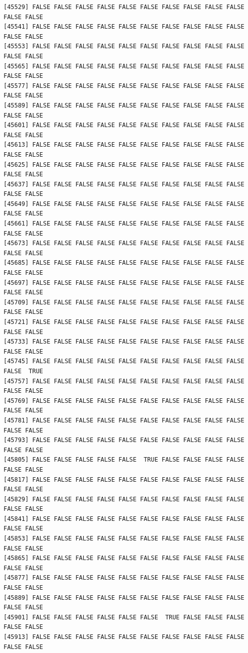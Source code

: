 \documentclass[
  a4paper,
  DIV=11,
  numbers=noendperiod]{scrartcl}
\begin{document}
\begin{verbatim}
[45529] FALSE FALSE FALSE FALSE FALSE FALSE FALSE FALSE FALSE FALSE FALSE FALSE
[45541] FALSE FALSE FALSE FALSE FALSE FALSE FALSE FALSE FALSE FALSE FALSE FALSE
[45553] FALSE FALSE FALSE FALSE FALSE FALSE FALSE FALSE FALSE FALSE FALSE FALSE
[45565] FALSE FALSE FALSE FALSE FALSE FALSE FALSE FALSE FALSE FALSE FALSE FALSE
[45577] FALSE FALSE FALSE FALSE FALSE FALSE FALSE FALSE FALSE FALSE FALSE FALSE
[45589] FALSE FALSE FALSE FALSE FALSE FALSE FALSE FALSE FALSE FALSE FALSE FALSE
[45601] FALSE FALSE FALSE FALSE FALSE FALSE FALSE FALSE FALSE FALSE FALSE FALSE
[45613] FALSE FALSE FALSE FALSE FALSE FALSE FALSE FALSE FALSE FALSE FALSE FALSE
[45625] FALSE FALSE FALSE FALSE FALSE FALSE FALSE FALSE FALSE FALSE FALSE FALSE
[45637] FALSE FALSE FALSE FALSE FALSE FALSE FALSE FALSE FALSE FALSE FALSE FALSE
[45649] FALSE FALSE FALSE FALSE FALSE FALSE FALSE FALSE FALSE FALSE FALSE FALSE
[45661] FALSE FALSE FALSE FALSE FALSE FALSE FALSE FALSE FALSE FALSE FALSE FALSE
[45673] FALSE FALSE FALSE FALSE FALSE FALSE FALSE FALSE FALSE FALSE FALSE FALSE
[45685] FALSE FALSE FALSE FALSE FALSE FALSE FALSE FALSE FALSE FALSE FALSE FALSE
[45697] FALSE FALSE FALSE FALSE FALSE FALSE FALSE FALSE FALSE FALSE FALSE FALSE
[45709] FALSE FALSE FALSE FALSE FALSE FALSE FALSE FALSE FALSE FALSE FALSE FALSE
[45721] FALSE FALSE FALSE FALSE FALSE FALSE FALSE FALSE FALSE FALSE FALSE FALSE
[45733] FALSE FALSE FALSE FALSE FALSE FALSE FALSE FALSE FALSE FALSE FALSE FALSE
[45745] FALSE FALSE FALSE FALSE FALSE FALSE FALSE FALSE FALSE FALSE FALSE  TRUE
[45757] FALSE FALSE FALSE FALSE FALSE FALSE FALSE FALSE FALSE FALSE FALSE FALSE
[45769] FALSE FALSE FALSE FALSE FALSE FALSE FALSE FALSE FALSE FALSE FALSE FALSE
[45781] FALSE FALSE FALSE FALSE FALSE FALSE FALSE FALSE FALSE FALSE FALSE FALSE
[45793] FALSE FALSE FALSE FALSE FALSE FALSE FALSE FALSE FALSE FALSE FALSE FALSE
[45805] FALSE FALSE FALSE FALSE FALSE  TRUE FALSE FALSE FALSE FALSE FALSE FALSE
[45817] FALSE FALSE FALSE FALSE FALSE FALSE FALSE FALSE FALSE FALSE FALSE FALSE
[45829] FALSE FALSE FALSE FALSE FALSE FALSE FALSE FALSE FALSE FALSE FALSE FALSE
[45841] FALSE FALSE FALSE FALSE FALSE FALSE FALSE FALSE FALSE FALSE FALSE FALSE
[45853] FALSE FALSE FALSE FALSE FALSE FALSE FALSE FALSE FALSE FALSE FALSE FALSE
[45865] FALSE FALSE FALSE FALSE FALSE FALSE FALSE FALSE FALSE FALSE FALSE FALSE
[45877] FALSE FALSE FALSE FALSE FALSE FALSE FALSE FALSE FALSE FALSE FALSE FALSE
[45889] FALSE FALSE FALSE FALSE FALSE FALSE FALSE FALSE FALSE FALSE FALSE FALSE
[45901] FALSE FALSE FALSE FALSE FALSE FALSE  TRUE FALSE FALSE FALSE FALSE FALSE
[45913] FALSE FALSE FALSE FALSE FALSE FALSE FALSE FALSE FALSE FALSE FALSE FALSE

\end{verbatim}
\end{document}
